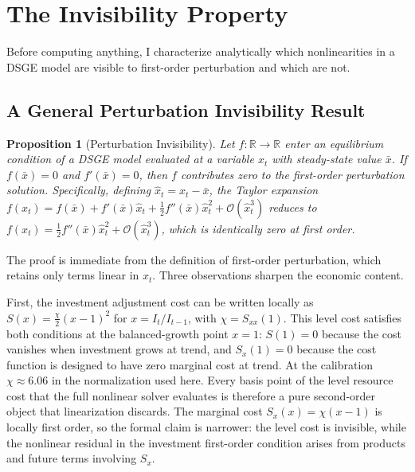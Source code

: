 \documentclass[12pt]{article}
\theoremstyle{plain}
\newtheorem{proposition}[theorem]{Proposition}
\theoremstyle{definition}
\theoremstyle{remark}
\begin{document}

\section{The Invisibility Property}
\label{sec:invisibility}

Before computing anything, I characterize analytically which nonlinearities in a DSGE model are visible to first-order perturbation and which are not.

\subsection{A General Perturbation Invisibility Result}

\begin{proposition}[Perturbation Invisibility]
\label{prop:invisibility}
Let $f: \mathbb{R} \to \mathbb{R}$ enter an equilibrium condition of a DSGE model evaluated at a variable $x_t$ with steady-state value $\bar{x}$. If $f(\bar{x}) = 0$ and $f'(\bar{x}) = 0$, then $f$ contributes zero to the first-order perturbation solution. Specifically, defining $\hat{x}_t = x_t - \bar{x}$, the Taylor expansion $f(x_t) = f(\bar{x}) + f'(\bar{x})\hat{x}_t + \tfrac{1}{2}f''(\bar{x})\hat{x}_t^2 + \mathcal{O}(\hat{x}_t^3)$ reduces to $f(x_t) = \tfrac{1}{2}f''(\bar{x})\hat{x}_t^2 + \mathcal{O}(\hat{x}_t^3)$, which is identically zero at first order.
\end{proposition}

The proof is immediate from the definition of first-order perturbation, which retains only terms linear in $\hat{x}_t$. Three observations sharpen the economic content.

First, the investment adjustment cost can be written locally as $S(x) = \tfrac{\chi}{2}(x-1)^2$ for $x = I_t/I_{t-1}$, with $\chi=S_{xx}(1)$. This level cost satisfies both conditions at the balanced-growth point $x=1$: $S(1) = 0$ because the cost vanishes when investment grows at trend, and $S_x(1) = 0$ because the cost function is designed to have zero marginal cost at trend. At the \citet{smets2007shocks} calibration $\chi \approx 6.06$ in the normalization used here. Every basis point of the level resource cost that the full nonlinear solver evaluates is therefore a pure second-order object that linearization discards. The marginal cost $S_x(x)=\chi(x-1)$ is locally first order, so the formal claim is narrower: the level cost is invisible, while the nonlinear residual in the investment first-order condition arises from products and future terms involving $S_x$.
\end{document}
